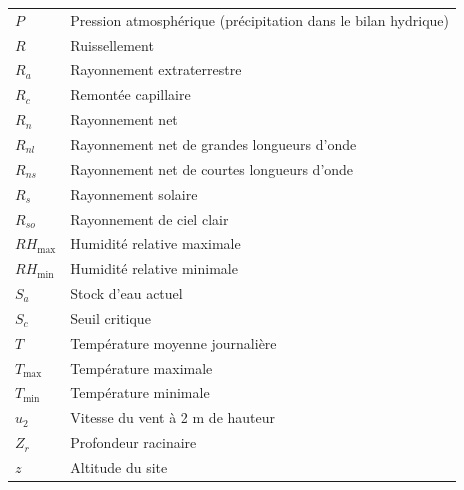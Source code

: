 \begin{longtable}{p{3.5cm}p{11cm}}
    $P$ & Pression atmosphérique (précipitation dans le bilan hydrique) \\
    $R$ & Ruissellement \\
    $R_a$ & Rayonnement extraterrestre \\
    $R_c$ & Remontée capillaire \\
    $R_n$ & Rayonnement net \\
    $R_{nl}$ & Rayonnement net de grandes longueurs d'onde \\
    $R_{ns}$ & Rayonnement net de courtes longueurs d'onde \\
    $R_s$ & Rayonnement solaire \\
    $R_{so}$ & Rayonnement de ciel clair \\
    $RH_{\max}$ & Humidité relative maximale \\
    $RH_{\min}$ & Humidité relative minimale \\
    $S_a$ & Stock d'eau actuel \\
    $S_c$ & Seuil critique \\
    $T$ & Température moyenne journalière \\
    $T_{\max}$ & Température maximale \\
    $T_{\min}$ & Température minimale \\
    $u_2$ & Vitesse du vent à 2 m de hauteur \\
    $Z_r$ & Profondeur racinaire \\
    $z$ & Altitude du site \\
\end{longtable}